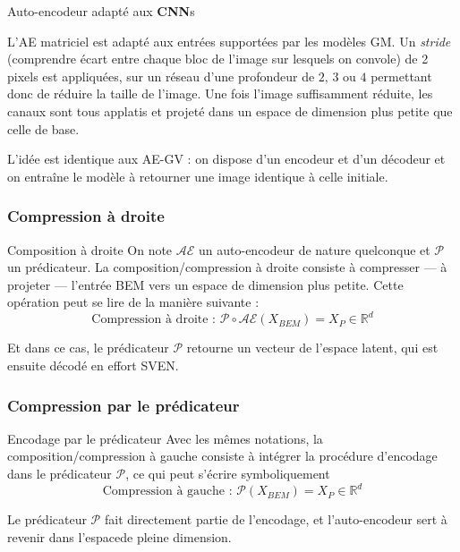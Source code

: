 \documentclass[
11pt,notheorems,hyperref={pdfauthor=whatever}
]{beamer}
\begin{document}
\begin{frame}{Auto-encodeur adapté aux \textbf{CNN}s}
    \begin{center}
        L'AE matriciel est adapté aux entrées supportées par les modèles GM. Un \textit{stride} (comprendre écart entre chaque bloc de l'image sur lesquels on convole) de 2 pixels est appliquées, sur un réseau d'une 
        profondeur de $2\text{, } 3 \text{ ou } 4$ permettant donc de réduire la taille de l'image. Une fois l'image suffisamment réduite, les canaux sont tous applatis et projeté dans un espace de dimension plus petite que celle de base.
        
        \vspace{0.3cm}
        
        L'idée est identique aux AE-GV : on dispose d'un encodeur et d'un décodeur et on entraîne le modèle à retourner une image identique à celle initiale.
    \end{center}
\end{frame}


\subsubsection{Compression à droite}
\begin{frame}{Composition à droite}
    On note $\mathcal{AE}$ un auto-encodeur de nature quelconque et $\mathcal{P}$ un prédicateur. La composition/compression à droite consiste à compresser — à projeter — l'entrée BEM vers un espace de dimension plus petite. Cette opération peut se lire de la manière suivante :
    \[
    \text{Compression à droite : }  \mathcal{P} \circ \mathcal{AE} (X_{BEM}) = X_{P} \in \mathbb{R}^{d}
    \]

    Et dans ce cas, le prédicateur $\mathcal{P}$ retourne un vecteur de l'espace latent, qui est ensuite décodé en effort SVEN.
\end{frame}

\subsubsection{Compression par le prédicateur}

\begin{frame}{Encodage par le prédicateur}
    Avec les mêmes notations, la composition/compression à gauche consiste à intégrer la procédure d'encodage dans le prédicateur $\mathcal{P}$, ce qui peut s'écrire symboliquement 
    \[
        \text{Compression à gauche : } \mathcal{P}(X_{BEM}) = X_{P} \in \mathbb{R}^d
    \]

    Le prédicateur $\mathcal{P}$ fait directement partie de l'encodage, et l'auto-encodeur sert à revenir dans l'espacede pleine dimension.
\end{frame}
\end{document}
